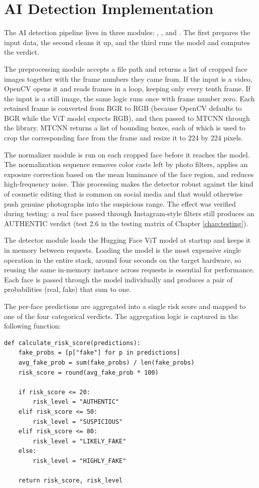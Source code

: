\section{AI Detection Implementation}

The AI detection pipeline lives in three modules: , , and . The first prepares the input data, the second cleans it up, and the third runs the model and computes the verdict.

The preprocessing module accepts a file path and returns a list of cropped face images together with the frame numbers they came from. If the input is a video, OpenCV opens it and reads frames in a loop, keeping only every tenth frame. If the input is a still image, the same logic runs once with frame number zero. Each retained frame is converted from BGR to RGB (because OpenCV defaults to BGR while the ViT model expects RGB), and then passed to MTCNN through the  library. MTCNN returns a list of bounding boxes, each of which is used to crop the corresponding face from the frame and resize it to 224 by 224 pixels.

The normalizer module is run on each cropped face before it reaches the model. The normalization sequence removes color casts left by photo filters, applies an exposure correction based on the mean luminance of the face region, and reduces high-frequency noise. This processing makes the detector robust against the kind of cosmetic editing that is common on social media and that would otherwise push genuine photographs into the suspicious range. The effect was verified during testing: a real face passed through Instagram-style filters still produces an AUTHENTIC verdict (test 2.6 in the testing matrix of Chapter \ref{chap:testing}).

The detector module loads the Hugging Face ViT model at startup and keeps it in memory between requests. Loading the model is the most expensive single operation in the entire stack, around four seconds on the target hardware, so reusing the same in-memory instance across requests is essential for performance. Each face is passed through the model individually and produces a pair of probabilities (real, fake) that sum to one.

The per-face predictions are aggregated into a single risk score and mapped to one of the four categorical verdicts. The aggregation logic is captured in the following function:

\begin{verbatim}
def calculate_risk_score(predictions):
    fake_probs = [p["fake"] for p in predictions]
    avg_fake_prob = sum(fake_probs) / len(fake_probs)
    risk_score = round(avg_fake_prob * 100)

    if risk_score <= 20:
        risk_level = "AUTHENTIC"
    elif risk_score <= 50:
        risk_level = "SUSPICIOUS"
    elif risk_score <= 80:
        risk_level = "LIKELY_FAKE"
    else:
        risk_level = "HIGHLY_FAKE"

    return risk_score, risk_level
\end{verbatim}

